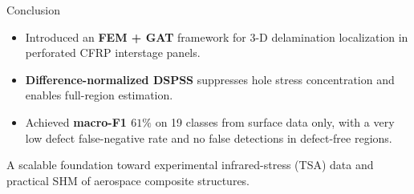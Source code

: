 \documentclass[aspectratio=169,11pt]{beamer}
\newcommand{\best}[1]{{\color{okgreen}\textbf{#1}}}
\begin{document}
\begin{frame}{Conclusion}
\begin{itemize}
  \item Introduced an \textbf{FEM + GAT} framework for 3-D delamination
        localization in perforated CFRP interstage panels.
  \item \textbf{Difference-normalized DSPSS} suppresses hole stress
        concentration and enables full-region estimation.
  \item Achieved \best{macro-F1 $61\%$} on 19 classes from surface data only,
        with a very low defect false-negative rate and no false detections in
        defect-free regions.
\end{itemize}
\vspace{0.3em}
\begin{block}{A scalable foundation}
toward experimental infrared-stress (TSA) data and practical SHM of aerospace
composite structures.
\end{block}
\end{frame}
\end{document}
